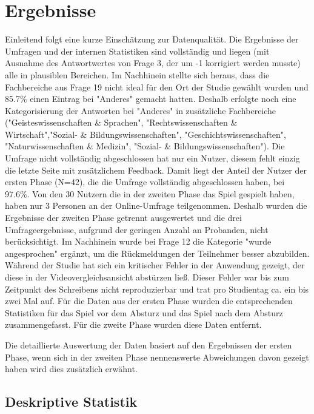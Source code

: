 \chapter{Ergebnisse}
Einleitend folgt eine kurze Einschätzung zur Datenqualität.
Die Ergebnisse der Umfragen und der internen Statistiken sind vollständig und 
liegen (mit Ausnahme des Antwortwertes von Frage 3, der um -1 korrigiert werden musste) alle in plausiblen Bereichen.
Im Nachhinein stellte sich heraus, dass die Fachbereiche aus Frage 19 nicht ideal für den Ort der Studie gewählt wurden und 85.7\% einen Eintrag bei "Anderes" gemacht hatten. 
Deshalb erfolgte noch eine Kategorisierung der Antworten bei "Anderes" in zusätzliche Fachbereiche 
("Geisteswissenschaften \& Sprachen", "Rechtswissenschaften \& Wirtschaft","Sozial- \& Bildungswissenschaften", 
"Geschichtswissenschaften", "Naturwissenschaften \& Medizin", "Sozial- \& Bildungswissenschaften"). 
Die Umfrage nicht vollständig abgeschlossen hat nur ein Nutzer, diesem fehlt einzig die letzte Seite mit zusätzlichem Feedback. 
Damit liegt der Anteil der Nutzer der ersten Phase (N=42), die die Umfrage vollständig abgeschlossen haben, bei 97.6\%. 
Von den 30 Nutzern die in der zweiten Phase das Spiel gespielt haben, haben nur 3 Personen an der Online-Umfrage teilgenommen. 
Deshalb wurden die Ergebnisse der zweiten Phase getrennt ausgewertet und die drei Umfrageergebnisse, aufgrund der geringen Anzahl an Probanden, nicht berücksichtigt. 
Im Nachhinein wurde bei Frage 12 die Kategorie "wurde angesprochen" ergänzt, um die Rückmeldungen der Teilnehmer besser abzubilden.
Während der Studie hat sich ein kritischer Fehler in der Anwendung gezeigt, der diese in der Videovergleichsansicht abstürzen ließ. 
Dieser Fehler war bis zum Zeitpunkt des Schreibens nicht reproduzierbar und trat pro Studientag ca. ein bis zwei Mal auf. 
Für die Daten aus der ersten Phase wurden die entsprechenden Statistiken für das Spiel vor dem Absturz und das Spiel nach dem Absturz zusammengefasst. 
Für die zweite Phase wurden diese Daten entfernt.

Die detaillierte Auswertung der Daten basiert auf den Ergebnissen der ersten Phase, 
wenn sich in der zweiten Phase nennenswerte Abweichungen davon gezeigt haben wird dies zusätzlich erwähnt. 
\section{Deskriptive Statistik}

